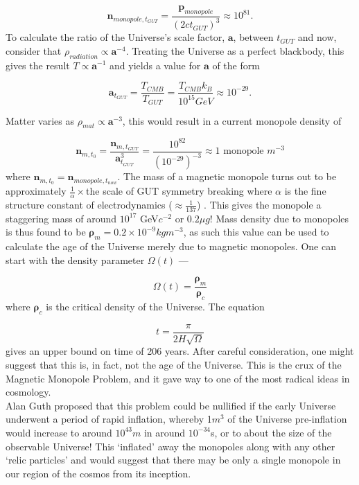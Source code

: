 \documentclass[twocolumn, 10pt]{article}
\begin{document}
\begin{equation}
\bm{n}_{monopole,t_{GUT}} = \frac{\bm{p}_{monopole}}{(2ct_{GUT})^3} \approx 10^{81}.
\end{equation}
To calculate the ratio of the Universe's scale factor, $\bm{a}$, between $t_{GUT}$ and now, consider that $\rho_{radiation} \propto \bm{a}^{-4}$. Treating the Universe as a perfect blackbody, this gives the result $T \propto \bm{a}^{-1}$ and yields a value for $\bm{a}$ of the form \cite{liddle2015cosmo}

\begin{equation}
\bm{a}_{t_{GUT}} = \frac{T_{CMB}}{T_{GUT}} = \frac{T_{CMB}k_B}{10^{15}GeV} \approx 10^{-29}.
\end{equation}

Matter varies as $\rho_{mat} \propto \bm{a}^{-3}$, this would result in a current monopole density of

\begin{equation}
\bm{n}_{m,t_{0}} = \frac{\bm{n}_{m,t_{GUT}}}{{\bm{a}_{t_{GUT}}^3}}= \frac{10^{82}}{(10^{-29})^{-3}} \approx 1 \text{ monopole } m^{-3}
\end{equation}
where $\bm{n}_{m,t_{0}} = \bm{n}_{monopole,t_{now}}$. The mass of a magnetic monopole turns out to be approximately $\frac{1}{\alpha}\times$the scale of GUT symmetry breaking where $\alpha$ is the fine structure constant of electrodynamics ($\approx\frac{1}{137}$) \cite{guth2015lecs}. This gives the monopole a staggering mass of around $10^{17}$ GeV$c^{-2}$ or $0.2 \mu g$! Mass density due to monopoles is thus found to be $\bm{\rho}_m = 0.2\times10^{-9} kgm^{-3}$, as such this value can be used to calculate the age of the Universe merely due to magnetic monopoles. One can start with the density parameter $\Omega(t)$ \cite{liddle2015cosmo}---

\begin{equation}
\Omega(t) = \frac{\bm{\rho}_m}{\bm{\rho}_c}
\end{equation}
where $\bm{\rho}_c$ is the critical density of the Universe. The equation \cite{guth2015lecs}

\begin{equation}
t = \frac{\pi}{2H\sqrt\Omega}
\end{equation}
gives an upper bound on time of 206 years. After careful consideration, one might suggest that this is, in fact, not the age of the Universe. This is the crux of the Magnetic Monopole Problem, and it gave way to one of the most radical ideas in cosmology. \\
\indent Alan Guth proposed that this problem could be nullified if the early Universe underwent a period of rapid inflation, whereby 1$m^3$ of the Universe pre-inflation would increase to around $10^{43}m$ in around $10^{-34}$s, or to about the size of the observable Universe! This `inflated' away the monopoles \cite{rajantie2012magnetic, liddle2015cosmo} along with any other `relic particles' and would suggest that there may be only a single monopole in our region of the cosmos from its inception.
\end{document}
